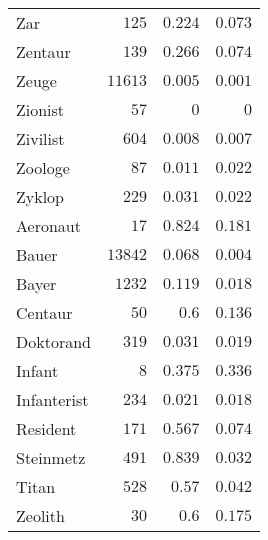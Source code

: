 \begin{supertabular}{lrrr}
Zar & $125$ & $0.224$ & $0.073$ \\
Zentaur & $139$ & $0.266$ & $0.074$ \\
Zeuge & $11613$ & $0.005$ & $0.001$ \\
Zionist & $57$ & $0$ & $0$ \\
Zivilist & $604$ & $0.008$ & $0.007$ \\
Zoologe & $87$ & $0.011$ & $0.022$ \\
Zyklop & $229$ & $0.031$ & $0.022$ \\
Aeronaut & $17$ & $0.824$ & $0.181$ \\
Bauer & $13842$ & $0.068$ & $0.004$ \\
Bayer & $1232$ & $0.119$ & $0.018$ \\
Centaur & $50$ & $0.6$ & $0.136$ \\
Doktorand & $319$ & $0.031$ & $0.019$ \\
Infant & $8$ & $0.375$ & $0.336$ \\
Infanterist & $234$ & $0.021$ & $0.018$ \\
Resident & $171$ & $0.567$ & $0.074$ \\
Steinmetz & $491$ & $0.839$ & $0.032$ \\
Titan & $528$ & $0.57$ & $0.042$ \\
Zeolith & $30$ & $0.6$ & $0.175$ \\
\end{supertabular}

\normalsize
\onecolumn
